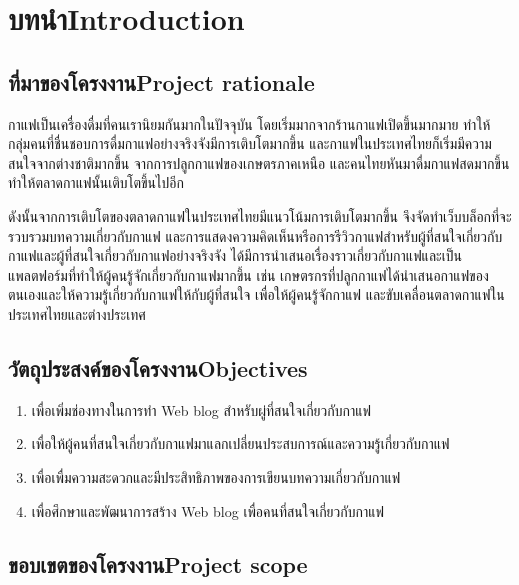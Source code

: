 \chapter{\ifcpe บทนำ\else Introduction\fi}

\section{\ifcpe ที่มาของโครงงาน\else Project rationale\fi}

กาแฟเป็นเครื่องดื่มที่คนเรานิยมกันมากในปัจจุบัน โดยเริ่มมากจากร้านกาแฟเปิดขึ้นมากมาย ทำให้กลุ่มคนที่ชื่นชอบการดื่มกาแฟอย่างจริงจังมีการเติบโตมากขึ้น และกาแฟในประเทศไทยก็เริ่มมีความสนใจจากต่างชาติมากขึ้น จากการปลูกกาแฟของเกษตรภาคเหนือ และคนไทยหันมาดื่มกาแฟสดมากขึ้นทำให้ตลาดกาแฟนั้นเติบโตขึ้นไปอีก

ดังนั้นจากการเติบโตของตลาดกาแฟในประเทศไทยมีแนวโน้มการเติบโตมากขึ้น จึงจัดทำเว็บบล็อกที่จะรวบรวมบทความเกี่ยวกับกาแฟ และการแสดงความคิดเห็นหรือการรีวิวกาแฟสำหรับผู้ที่สนใจเกี่ยวกับกาแฟและผู้ที่สนใจเกี่ยวกับกาแฟอย่างจริงจัง ได้มีการนำเสนอเรื่องราวเกี่ยวกับกาแฟและเป็นแพลตฟอร์มที่ทำให้ผู้คนรู้จักเกี่ยวกับกาแฟมากขึ้น เช่น เกษตรกรที่ปลูกกาแฟได้นำเสนอกาแฟของตนเองและให้ความรู้เกี่ยวกับกาแฟให้กับผู้ที่สนใจ เพื่อให้ผู้คนรู้จักกาแฟ และขับเคลื่อนตลาดกาแฟในประเทศไทยและต่างประเทศ
\section{\ifcpe วัตถุประสงค์ของโครงงาน\else Objectives\fi}
\begin{enumerate}
    \item เพื่อเพิ่มช่องทางในการทำ Web blog สำหรับผู่ที่สนใจเกี่ยวกับกาแฟ
    \item เพื่อให้ผู้คนที่สนใจเกี่ยวกับกาแฟมาแลกเปลี่ยนประสบการณ์และความรู้เกี่ยวกับกาแฟ
    \item เพื่อเพื่มความสะดวกและมีประสิทธิภาพของการเขียนบทความเกี่ยวกับกาแฟ
    \item เพื่อศึกษาและพัฒนาการสร้าง Web blog เพื่อคนที่สนใจเกี่ยวกับกาแฟ
\end{enumerate}

\section{\ifcpe ขอบเขตของโครงงาน\else Project scope\fi}

